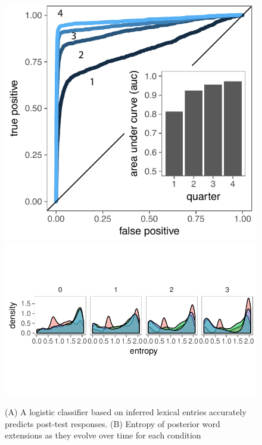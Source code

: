 \documentclass[10pt,letterpaper]{article}
\begin{document}
\begin{figure}[t]
\begin{center}
\includegraphics[scale=0.6]{modelPerformance_edited.pdf}
\includegraphics[scale=.9]{entropies.pdf}
{\caption{{(A) A logistic classifier based on inferred lexical entries accurately predicts post-test responses. (B) Entropy of  posterior word extensions as they evolve over time for each condition   \label{fig:postTestPrediction}}}}
\end{center}
\end{figure}
\end{document}

